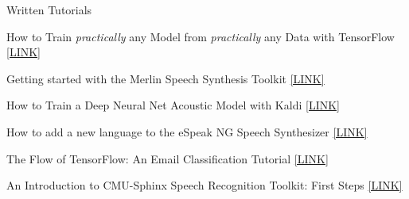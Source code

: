 \documentclass{resume} %
\begin{document}




\begin{minipage}{\textwidth}
\begin{rSection}{Written Tutorials}
  \vspace{.25cm}

  {How to Train \textit{practically} any Model from \textit{practically} any Data with TensorFlow} \hfill \href{http://jrmeyer.github.io/machinelearning/2019/05/29/tensorflow-dataset-estimator-api.html}{[LINK]}%

    \vspace{.25cm}

  {Getting started with the Merlin Speech Synthesis Toolkit} \hfill  \href{http://jrmeyer.github.io/tts/2017/02/14/Installing-Merlin.html}{[LINK]}%
    \vspace{.25cm}
  
  {How to Train a Deep Neural Net Acoustic Model with Kaldi} \hfill \href{http://jrmeyer.github.io/asr/2016/12/15/DNN-AM-Kaldi.html}{[LINK]}%
    \vspace{.25cm}

  {How to add a new language to the eSpeak NG Speech Synthesizer} \hfill \href{http://jrmeyer.github.io/tts/2016/07/03/How-to-Add-a-Language-to-eSpeak-NG.html}{[LINK]}%
    \vspace{.25cm}

  {The Flow of TensorFlow: An Email Classification Tutorial} \hfill \href{http://jrmeyer.github.io/machinelearning/2016/02/01/TensorFlow-Tutorial.html}{[LINK]}%
    \vspace{.25cm}

  {An Introduction to CMU-Sphinx Speech Recognition Toolkit: First Steps}  \hfill \href{http://jrmeyer.github.io/asr/2016/01/09/Installing-CMU-Sphinx-on-Ubuntu.html}{[LINK]}%
 
\end{rSection}
\end{minipage}
\end{document}
